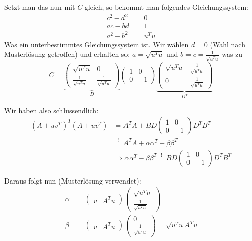 \documentclass[11pt]{article}
\begin{document}
Setzt man das nun mit $C$ gleich, so bekommt man folgendes Gleichungssystem:
\begin{align*}
c^2 - d^2 &= 0 \\
ac - bd &= 1 \\
a^2 - b^2 &= u^T u
\end{align*} Was ein unterbestimmtes Gleichungssystem ist. Wir wählen $d = 0$ (Wahl nach Musterlösung getroffen) und erhalten so: $a = \sqrt{u^T u}$ und $b = c= \frac{1}{\sqrt{u^T u}}$ was zu
\begin{equation*}
C =
\underbrace{\begin{pmatrix}
\sqrt{u^T u} & 0 \\
\frac{1}{\sqrt{u^T u}} & \frac{1}{\sqrt{u^T u}}
\end{pmatrix}}_{D}
\begin{pmatrix}
1 & 0 \\
0 & -1
\end{pmatrix}
\underbrace{
\begin{pmatrix}
\sqrt{u^T u} & \frac{1}{\sqrt{u^T u}} \\
0 & \frac{1}{\sqrt{u^T u}}
\end{pmatrix}}_{D^T}
\end{equation*}

Wir haben also schlussendlich:
\begin{align*}
(A + uv^T)^T(A + uv^T) &= A^T A + B D \begin{pmatrix} 1 & 0 \\ 0 & -1 \end{pmatrix} D^T B^T \\
&\stackrel{\text{!}}{=} A^T A + \alpha \alpha^T - \beta \beta^T\\
&\Rightarrow \alpha \alpha^T - \beta \beta^T \stackrel{\text{!}}{=} B D \begin{pmatrix} 1 & 0 \\ 0 & -1 \end{pmatrix} D^T B^T
\end{align*}

Daraus folgt nun (Musterlösung verwendet):
\begin{align*}
\alpha &= \begin{pmatrix} v & A^T u \end{pmatrix} \begin{pmatrix} \sqrt{u^T u} \\ \frac{1}{\sqrt{u^T u}} \end{pmatrix} \\
\beta &= \begin{pmatrix} v & A^T u \end{pmatrix} \begin{pmatrix} 0 \\ \frac{1}{\sqrt{u^T u}} \end{pmatrix} = \sqrt{u^T u} A^T u
\end{align*}
\end{document}
